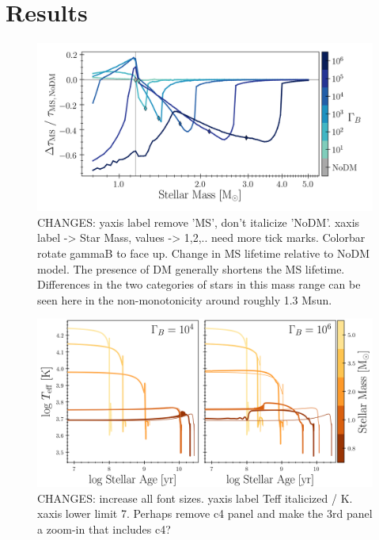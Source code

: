 \documentclass[useAMS,usenatbib]{mnras}
\begin{document}
\section{Results}
\label{sec:results}

  \begin{figure}
    \centering
    \includegraphics[width=\textwidth]{plots/mstau.png}
    \caption{CHANGES: yaxis label remove 'MS', don't italicize 'NoDM'. xaxis label -> Star Mass, values -> 1,2,.. need more tick marks. Colorbar rotate gammaB to face up. 
    Change in MS lifetime relative to NoDM model. The presence of DM generally shortens the MS lifetime.
    Differences in the two categories of stars in this mass range can be seen here in the non-monotonicity around roughly 1.3 Msun.
    }
    \label{fig:mstau}
  \end{figure}

  \begin{figure}
    \centering
    \includegraphics[width=\textwidth]{plots/Teff.png}
    \caption{CHANGES: increase all font sizes. yaxis label Teff italicized / K. xaxis lower limit 7. Perhaps remove c4 panel and make the 3rd panel a zoom-in that includes c4?}
    \label{fig:Teff}
  \end{figure}
\end{document}
